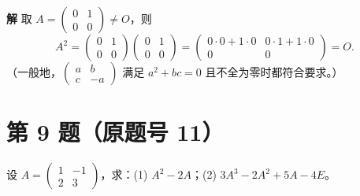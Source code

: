 \documentclass[11pt,a4paper]{ctexart}
\newenvironment{problem}[1]
  {\par\medskip\noindent\textbf{#1}\quad}
  {\par}
\newenvironment{solution}
  {\par\noindent\textbf{解}\quad}
  {\par}
\begin{document}
\begin{solution}
取 $A=\begin{pmatrix}0&1\\0&0\end{pmatrix}\neq O$，则
\[
A^2=\begin{pmatrix}0&1\\0&0\end{pmatrix}\begin{pmatrix}0&1\\0&0\end{pmatrix}
=\begin{pmatrix}0\cdot0+1\cdot0&0\cdot1+1\cdot0\\0&0\end{pmatrix}=O.
\]
（一般地，$\begin{pmatrix}a&b\\c&-a\end{pmatrix}$ 满足 $a^2+bc=0$ 且不全为零时都符合要求。）
\end{solution}

\section*{第 9 题（原题号 11）}

\begin{problem}{}设 $A=\begin{pmatrix}1&-1\\2&3\end{pmatrix}$，求：(1) $A^2-2A$；(2) $3A^3-2A^2+5A-4E$。\end{problem}
\end{document}
